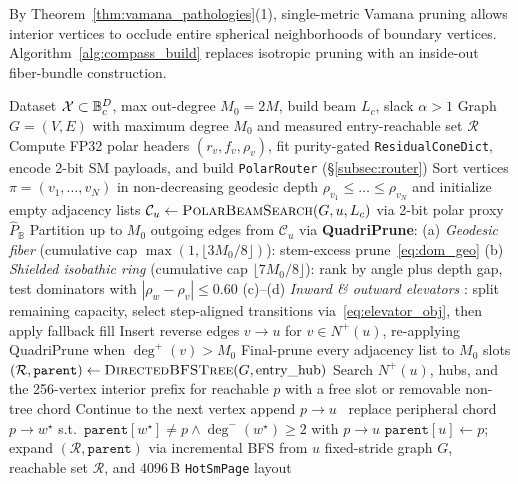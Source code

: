 By Theorem~\ref{thm:vamana_pathologies}(1), single-metric {Vamana} pruning allows interior vertices to occlude entire spherical neighborhoods of boundary vertices.
Algorithm~\ref{alg:compass_build} replaces isotropic pruning with an inside-out fiber-bundle construction.

\begin{algorithm}[t]
\caption{Warped-Product Construction \& Chord-Swap Repair}
\label{alg:compass_build}
\small
\begin{algorithmic}[1]
\Require Dataset $\mathcal{X} \subset \mathbb{B}_c^D$, max out-degree $M_0 = 2M$, build beam $L_c$, slack $\alpha > 1$
\Ensure Graph $G=(V,E)$ with maximum degree $M_0$ and measured entry-reachable set $\mathcal R$
\State Compute FP32 polar headers $(r_v, f_v, \rho_v)$, fit purity-gated \texttt{ResidualConeDict}, encode 2-bit {SM} payloads, and build \texttt{PolarRouter} (\S\ref{subsec:router})
\State Sort vertices $\pi = (v_1, \dots, v_N)$ in non-decreasing geodesic depth $\rho_{v_1} \le \dots \le \rho_{v_N}$ and initialize empty adjacency lists
    \State $\mathcal{C}_u \gets \textsc{PolarBeamSearch}(G, u, L_c)$ via 2-bit polar proxy $\widehat{P}_{\mathbb{B}}$
    \State Partition up to $M_0$ outgoing edges from $\mathcal{C}_u$ via \textbf{QuadriPrune}:
    \State \hspace{0.8em}(a) \emph{Geodesic fiber} (cumulative cap $\max(1,\lfloor3M_0/8\rfloor)$): stem-excess prune~\eqref{eq:dom_geo}
    \State \hspace{0.8em}(b) \emph{Shielded isobathic ring} (cumulative cap $\lfloor7M_0/8\rfloor$): rank by angle plus depth gap, test dominators with $|\rho_w-\rho_v|\le0.60$
    \State \hspace{0.8em}(c)--(d) \emph{Inward \& outward elevators} : split remaining capacity, select step-aligned transitions via~\eqref{eq:elevator_obj}, then apply fallback fill
    \State Insert reverse edges $v \to u$ for $v \in N^+(u)$, re-applying {QuadriPrune} when $\deg^+(v) > M_0$
  \EndFor
\EndFor
\State Final-prune every adjacency list to $M_0$ slots
\State $(\mathcal{R}, \texttt{parent}) \gets \textsc{DirectedBFSTree}(G, \text{entry\_hub})$ \Comment{\S\ref{subsec:repair}}
  \State Search $N^+(u)$, hubs, and the 256-vertex interior prefix for reachable $p$ with a free slot or removable non-tree chord
   \State Continue to the next vertex \EndIf
   append $p \to u$
  \Else\ replace peripheral chord $p \to w^\star$ s.t.\ $\texttt{parent}[w^\star] \ne p \land \deg^-(w^\star) \ge 2$ with $p \to u$
  \EndIf
  \State $\texttt{parent}[u] \gets p$; expand $(\mathcal{R}, \texttt{parent})$ via incremental {BFS} from $u$
\EndFor
\State \Return fixed-stride graph $G$, reachable set $\mathcal R$, and $4096$\,B \texttt{HotSmPage} layout
\end{algorithmic}
\end{algorithm}

